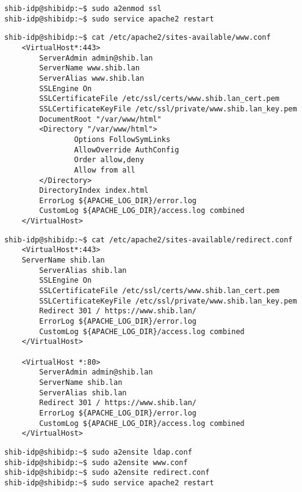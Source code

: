 \begin{lstlisting}
shib-idp@shibidp:~$ sudo a2enmod ssl
shib-idp@shibidp:~$ sudo service apache2 restart
\end{lstlisting}

\begin{lstlisting}
shib-idp@shibidp:~$ cat /etc/apache2/sites-available/www.conf 
	<VirtualHost*:443> 
		ServerAdmin admin@shib.lan
		ServerName www.shib.lan
		ServerAlias www.shib.lan
		SSLEngine On
		SSLCertificateFile /etc/ssl/certs/www.shib.lan_cert.pem
		SSLCertificateKeyFile /etc/ssl/private/www.shib.lan_key.pem
		DocumentRoot "/var/www/html"
		<Directory "/var/www/html">
				Options FollowSymLinks
				AllowOverride AuthConfig
				Order allow,deny
				Allow from all
		</Directory>
		DirectoryIndex index.html
		ErrorLog ${APACHE_LOG_DIR}/error.log
		CustomLog ${APACHE_LOG_DIR}/access.log combined
	</VirtualHost>
\end{lstlisting}
\begin{lstlisting}
shib-idp@shibidp:~$ cat /etc/apache2/sites-available/redirect.conf 
	<VirtualHost*:443> 
	ServerName shib.lan
		ServerAlias shib.lan 
		SSLEngine On
		SSLCertificateFile /etc/ssl/certs/www.shib.lan_cert.pem
		SSLCertificateKeyFile /etc/ssl/private/www.shib.lan_key.pem
		Redirect 301 / https://www.shib.lan/
		ErrorLog ${APACHE_LOG_DIR}/error.log
		CustomLog ${APACHE_LOG_DIR}/access.log combined
	</VirtualHost>

	<VirtualHost *:80>
		ServerAdmin admin@shib.lan
		ServerName shib.lan
		ServerAlias shib.lan 
		Redirect 301 / https://www.shib.lan/
		ErrorLog ${APACHE_LOG_DIR}/error.log
		CustomLog ${APACHE_LOG_DIR}/access.log combined
	</VirtualHost>
\end{lstlisting}
\begin{lstlisting}
shib-idp@shibidp:~$ sudo a2ensite ldap.conf
shib-idp@shibidp:~$ sudo a2ensite www.conf
shib-idp@shibidp:~$ sudo a2ensite redirect.conf
shib-idp@shibidp:~$ sudo service apache2 restart
\end{lstlisting}

